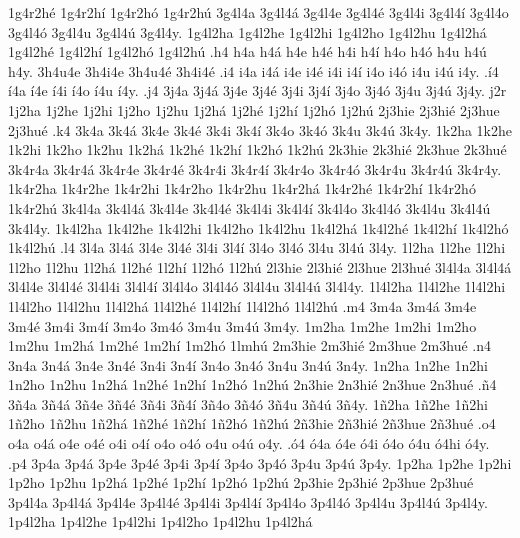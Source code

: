 {1g4r2h^^e9 1g4r2h^^ed 1g4r2h^^f3 1g4r2h^^fa
3g4l4a 3g4l4^^e1 3g4l4e 3g4l4^^e9 3g4l4i 3g4l4^^ed 3g4l4o 3g4l4^^f3 3g4l4u
3g4l4^^fa 3g4l4y.  1g4l2ha 1g4l2he 1g4l2hi 1g4l2ho 1g4l2hu 1g4l2h^^e1
1g4l2h^^e9 1g4l2h^^ed 1g4l2h^^f3 1g4l2h^^fa
.h4 h4a h4^^e1 h4e h4^^e9 h4i h4^^ed h4o h4^^f3 h4u h4^^fa h4y.
3h4u4e 3h4i4e 3h4u4^^e9 3h4i4^^e9
.i4 i4a i4^^e1 i4e i4^^e9 i4i i4^^ed i4o i4^^f3 i4u i4^^fa i4y.
.^^ed4 ^^ed4a ^^ed4e ^^ed4i ^^ed4o ^^ed4u ^^ed4y.
.j4 3j4a 3j4^^e1 3j4e 3j4^^e9 3j4i 3j4^^ed 3j4o 3j4^^f3 3j4u 3j4^^fa 3j4y.
j2r
1j2ha 1j2he 1j2hi 1j2ho 1j2hu 1j2h^^e1 1j2h^^e9 1j2h^^ed 1j2h^^f3 1j2h^^fa
2j3hie 2j3hi^^e9 2j3hue 2j3hu^^e9 
.k4 3k4a 3k4^^e1 3k4e 3k4^^e9 3k4i 3k4^^ed 3k4o 3k4^^f3 3k4u 3k4^^fa 3k4y.
1k2ha 1k2he 1k2hi 1k2ho 1k2hu 1k2h^^e1 1k2h^^e9 1k2h^^ed 1k2h^^f3 1k2h^^fa
2k3hie 2k3hi^^e9 2k3hue 2k3hu^^e9 
3k4r4a 3k4r4^^e1 3k4r4e 3k4r4^^e9 3k4r4i 3k4r4^^ed 3k4r4o 3k4r4^^f3 3k4r4u
3k4r4^^fa 3k4r4y. 1k4r2ha 1k4r2he 1k4r2hi 1k4r2ho 1k4r2hu 1k4r2h^^e1
1k4r2h^^e9 1k4r2h^^ed 1k4r2h^^f3 1k4r2h^^fa
3k4l4a 3k4l4^^e1 3k4l4e 3k4l4^^e9 3k4l4i 3k4l4^^ed 3k4l4o 3k4l4^^f3 3k4l4u
3k4l4^^fa 3k4l4y. 1k4l2ha 1k4l2he 1k4l2hi 1k4l2ho 1k4l2hu 1k4l2h^^e1
1k4l2h^^e9 1k4l2h^^ed 1k4l2h^^f3 1k4l2h^^fa
.l4 3l4a 3l4^^e1 3l4e 3l4^^e9 3l4i 3l4^^ed 3l4o 3l4^^f3 3l4u 3l4^^fa 3l4y.
1l2ha 1l2he 1l2hi 1l2ho 1l2hu 1l2h^^e1 1l2h^^e9 1l2h^^ed 1l2h^^f3 1l2h^^fa
2l3hie 2l3hi^^e9 2l3hue 2l3hu^^e9
3l4l4a 3l4l4^^e1 3l4l4e 3l4l4^^e9 3l4l4i 3l4l4^^ed 3l4l4o 3l4l4^^f3 3l4l4u
3l4l4^^fa 3l4l4y. 1l4l2ha 1l4l2he 1l4l2hi 1l4l2ho 1l4l2hu 1l4l2h^^e1
1l4l2h^^e9 1l4l2h^^ed 1l4l2h^^f3 1l4l2h^^fa
.m4 3m4a 3m4^^e1 3m4e 3m4^^e9 3m4i 3m4^^ed 3m4o 3m4^^f3 3m4u 3m4^^fa 3m4y.
1m2ha 1m2he 1m2hi 1m2ho 1m2hu 1m2h^^e1 1m2h^^e9 1m2h^^ed 1m2h^^f3 1lmh^^fa
2m3hie 2m3hi^^e9 2m3hue 2m3hu^^e9
.n4 3n4a 3n4^^e1 3n4e 3n4^^e9 3n4i 3n4^^ed 3n4o 3n4^^f3 3n4u 3n4^^fa 3n4y.
1n2ha 1n2he 1n2hi 1n2ho 1n2hu 1n2h^^e1 1n2h^^e9 1n2h^^ed 1n2h^^f3 1n2h^^fa
2n3hie 2n3hi^^e9 2n3hue 2n3hu^^e9
.^^f14 3^^f14a 3^^f14^^e1 3^^f14e 3^^f14^^e9 3^^f14i 3^^f14^^ed 3^^f14o
3^^f14^^f3 3^^f14u 3^^f14^^fa 3^^f14y.
1^^f12ha 1^^f12he 1^^f12hi 1^^f12ho 1^^f12hu 1^^f12h^^e1 1^^f12h^^e9
1^^f12h^^ed 1^^f12h^^f3 1^^f12h^^fa
2^^f13hie 2^^f13hi^^e9 2^^f13hue 2^^f13hu^^e9
.o4 o4a o4^^e1 o4e o4^^e9 o4i o4^^ed o4o o4^^f3 o4u o4^^fa o4y.
.^^f34 ^^f34a ^^f34e ^^f34i ^^f34o ^^f34u ^^f34hi ^^f34y.
.p4 3p4a 3p4^^e1 3p4e 3p4^^e9 3p4i 3p4^^ed 3p4o 3p4^^f3 3p4u 3p4^^fa 3p4y.
1p2ha 1p2he 1p2hi 1p2ho 1p2hu 1p2h^^e1 1p2h^^e9 1p2h^^ed 1p2h^^f3 1p2h^^fa
2p3hie 2p3hi^^e9 2p3hue 2p3hu^^e9
3p4l4a 3p4l4^^e1 3p4l4e 3p4l4^^e9 3p4l4i 3p4l4^^ed 3p4l4o 3p4l4^^f3 3p4l4u
3p4l4^^fa 3p4l4y. 1p4l2ha 1p4l2he 1p4l2hi 1p4l2ho 1p4l2hu 1p4l2h^^e1
}
